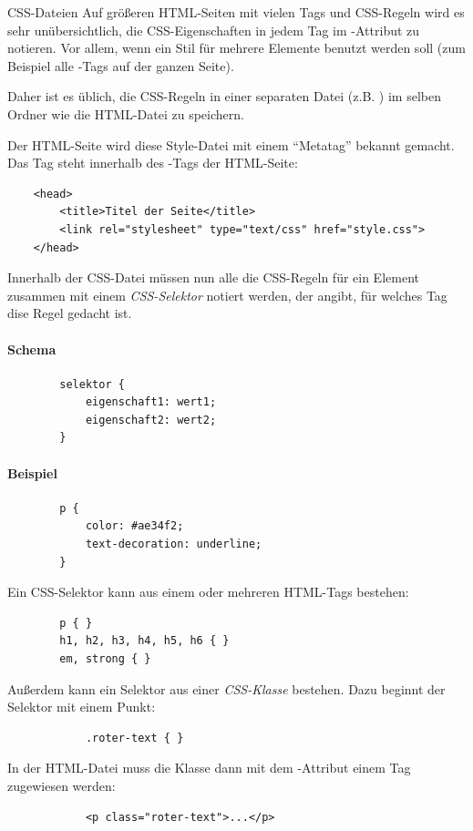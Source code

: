 \documentclass[lerntheke,12pt,a5paper,landscape]{arbeitsblatt}
\begin{document}
\begin{karte3}{CSS-Dateien}
	Auf größeren HTML-Seiten mit vielen Tags und CSS-Regeln wird es sehr unübersichtlich, die CSS-Eigenschaften in jedem Tag im -Attribut zu notieren. Vor allem, wenn ein Stil für mehrere Elemente benutzt werden soll (zum Beispiel alle -Tags auf der ganzen Seite).

	Daher ist es üblich, die CSS-Regeln in einer separaten Datei (z.B. ) im selben Ordner wie die HTML-Datei zu speichern.

	Der HTML-Seite wird diese Style-Datei mit einem \enquote{Metatag} bekannt gemacht. Das Tag steht innerhalb des -Tags der HTML-Seite:
	\begin{verbatim}
	<head>
		<title>Titel der Seite</title>
		<link rel="stylesheet" type="text/css" href="style.css">
	</head>
	\end{verbatim}

	Innerhalb der CSS-Datei müssen nun alle die CSS-Regeln für ein Element zusammen mit einem \emph{CSS-Selektor} notiert werden, der angibt, für welches Tag dise Regel gedacht ist.
\end{karte3}


\begin{loesungskarte}
	\begin{links}
		\paragraph{Schema\phantom{p}}
		\begin{verbatim}
		selektor {
			eigenschaft1: wert1;
			eigenschaft2: wert2;
		}
		\end{verbatim}
	\end{links}\begin{rechts}
		\paragraph{Beispiel}
		\begin{verbatim}
		p {
			color: #ae34f2;
			text-decoration: underline;
		}
		\end{verbatim}
	\end{rechts}

	\vspace*{1.2em}
	\begin{links}
		Ein CSS-Selektor kann aus einem oder mehreren HTML-Tags bestehen:
		\begin{verbatim}
		p { }
		h1, h2, h3, h4, h5, h6 { }
		em, strong { }
		\end{verbatim}
	\end{links}\begin{rechts}
		Außerdem kann ein Selektor aus einer \emph{CSS-Klasse} bestehen. Dazu beginnt der Selektor mit einem Punkt:
		\begin{verbatim}
			.roter-text { }
		\end{verbatim}
		In der HTML-Datei muss die Klasse dann mit dem -Attribut einem Tag zugewiesen werden:
		\begin{verbatim}
			<p class="roter-text">...</p>
		\end{verbatim}
	\end{rechts}
\end{loesungskarte}
\end{document}
